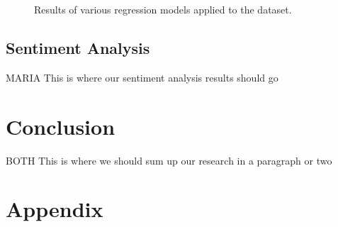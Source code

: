 \documentclass[10pt]{IEEEtran}
\begin{document}
    \begin{figure}
    \centering
    \caption{ Results of various regression models applied to the dataset. }
    \label{regression_results}
    \end{figure}

\subsection{Sentiment Analysis}
    MARIA
    This is where our sentiment analysis results should go

\section{Conclusion}
    BOTH
    This is where we should sum up our research in a paragraph or two

\newpage
\newpage


\newpage
\section{Appendix}
\end{document}
